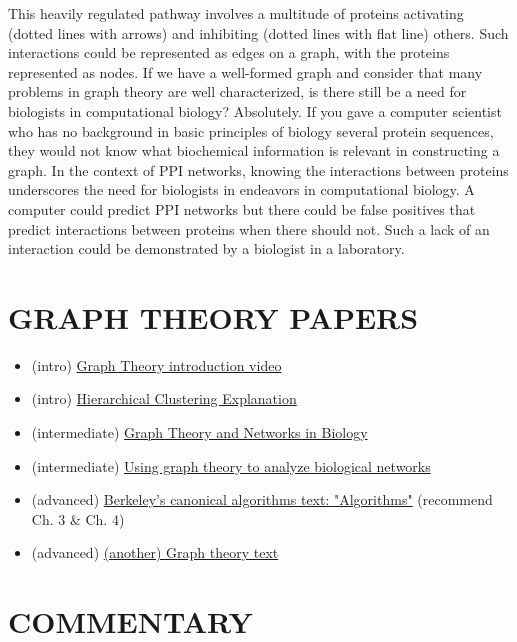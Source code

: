 \documentclass[11pt]{article}
\begin{document}
This heavily regulated pathway involves a multitude of proteins activating (dotted lines with arrows) and 
inhibiting (dotted lines with flat line) others. 
Such interactions could be represented as edges on a graph, 
with the proteins represented as nodes.
If we have a well-formed graph and consider that many problems in graph theory 
are well characterized, is there still be a need for biologists in 
computational biology? Absolutely. 
If you gave a computer scientist who has no background in basic principles of 
biology several protein sequences, they would not know what biochemical information 
is relevant in constructing a graph. In the context of PPI networks, 
knowing the interactions between proteins underscores the need for biologists 
in endeavors in computational biology. A computer could predict PPI networks but 
there could be false positives that predict interactions between proteins when 
there should not. Such a lack of an interaction could be demonstrated by a biologist 
in a laboratory. 

\section*{GRAPH THEORY PAPERS}

\begin{itemize}
\item (intro) \href{http://www.youtube.com/watch?v=HmQR8Xy9DeM}{Graph Theory introduction video}
\item (intro) \href{http://home.deib.polimi.it/matteucc/Clustering/tutorial_html/hierarchical.html}{Hierarchical Clustering Explanation}
\item (intermediate) \href{http://www.hamilton.ie/systemsbiology/files/2006/graph_theory_and_networks_in_biology.pdf}{Graph Theory and Networks in Biology}
\item (intermediate) \href{http://www.ncbi.nlm.nih.gov/pmc/articles/PMC3101653/}{Using graph theory to analyze biological networks}
\item (advanced) \href{http://www.cs.berkeley.edu/~vazirani/algorithms/}{Berkeley's canonical algorithms text: "Algorithms"} (recommend Ch. 3 & Ch. 4)
\item (advanced) \href{http://code.google.com/p/graphbook/}{(another) Graph theory text}
\end{itemize}

\section*{COMMENTARY}
\end{document}
